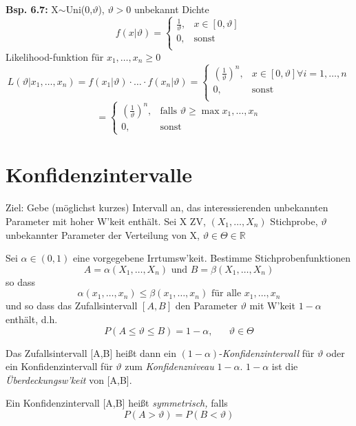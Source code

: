 \documentclass[a4paper,11pt]{article}
\begin{document}
\vspace{6pt}
\noindent\textbf{Bsp. 6.7:} X$\sim$Uni(0,$\vartheta$), $\vartheta>0$ unbekannt
\newline Dichte
\begin{equation*}
f(x|\vartheta)=\begin{cases}
\frac{1}{\vartheta}, & x\in[0,\vartheta]\\
0, & \text{sonst}\\
\end{cases}
\end{equation*}
Likelihood-funktion für $x_1,\dots,x_n\geq0$
\[L(\vartheta|x_1,\dots,x_n)=f(x_1|\vartheta)\cdot\dots\cdot f(x_n|\vartheta)=\begin{cases}
(\frac{1}{\vartheta})^n, & x\in[0,\vartheta] \forall i=1,\dots,n\\
0, & \text{sonst}\\
\end{cases}\]
\[=\begin{cases}
(\frac{1}{\vartheta})^n, & \text{falls } \vartheta\geq\max{x_1,\dots,x_n}\\
0, & \text{sonst}
\end{cases}\]

\section{Konfidenzintervalle}
\noindent Ziel: Gebe (möglichst kurzes) Intervall an, das interessierenden unbekannten Parameter mit hoher W'keit enthält. 
\newline Sei X ZV, $(X_1,\dots,X_n)$ Stichprobe, $\vartheta$ unbekannter Parameter der Verteilung von X, $\vartheta\in\Theta\in\mathbb{R}$

Sei $\alpha\in(0,1)$ eine vorgegebene Irrtumsw'keit. 
\newline Bestimme Stichprobenfunktionen
\[A=\alpha(X_1,\dots,X_n) \text{ und } B=\beta(X_1,\dots,X_n)\]
so dass 
\[\alpha(x_1,\dots,x_n)\leq\beta(x_1,\dots,x_n)\text{ für alle }x_1,\dots,x_n\]
und so dass das Zufallsintervall $[A,B]$ den Parameter $\vartheta$ mit W'keit $1-\alpha$ enthält, d.h.
\[P(A\leq\vartheta\leq B)=1-\alpha, \hspace{20pt}\vartheta\in\Theta\]

Das Zufallsintervall [A,B] heißt dann ein $(1-\alpha)$-\textit{Konfidenzintervall} für $\vartheta$ oder ein Konfidenzintervall für $\vartheta$ zum \textit{Konfidenzniveau} $1-\alpha$.
\newline $1-\alpha$ ist die \textit{Überdeckungsw'keit} von [A,B].

\noindent Ein Konfidenzintervall [A,B] heißt \textit{symmetrisch,} falls 
\[P(A>\vartheta) = P(B<\vartheta)\]
\end{document}
